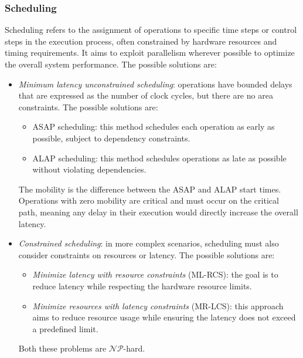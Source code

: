 \subsubsection{Scheduling}
Scheduling refers to the assignment of operations to specific time steps or control steps in the execution process, often constrained by hardware resources and timing requirements. 
It aims to exploit parallelism wherever possible to optimize the overall system performance.
The possible solutions are: 
\begin{itemize}
    \item \textit{Minimum latency unconstrained scheduling}: operations have bounded delays that are expressed as the number of clock cycles, but there are no area constraints.
        The possible solutions are: 
        \begin{itemize}
            \item ASAP scheduling: this method schedules each operation as early as possible, subject to dependency constraints.
            \item ALAP scheduling: this method schedules operations as late as possible without violating dependencies.
        \end{itemize}
        The mobility is the difference between the ASAP and ALAP start times.
        Operations with zero mobility are critical and must occur on the critical path, meaning any delay in their execution would directly increase the overall latency.
    \item \textit{Constrained scheduling}: in more complex scenarios, scheduling must also consider constraints on resources or latency. 
        The possible solutions are: 
        \begin{itemize}
            \item \textit{Minimize latency with resource constraints} (ML-RCS): the goal is to reduce latency while respecting the hardware resource limits.
            \item \textit{Minimize resources with latency constraints} (MR-LCS): this approach aims to reduce resource usage while ensuring the latency does not exceed a predefined limit.
        \end{itemize}
        Both these problems are $\mathcal{NP}$-hard. 
\end{itemize}


